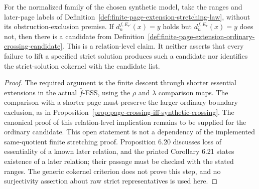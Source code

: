 \begin{lemma}
  \label{lem:page-extension-first-obstruction}
  \notready
  For the normalized family of the chosen synthetic model, take the ranges
  and later-page labels of
  Definition~\ref{def:finite-page-extension-stretching-law}, without its
  obstruction-exclusion premise. If
  $d_n^{f,E_{r'}}(x)=y$ holds but $d_n^{f,E_r}(x)=y$ does not, then there
  is a candidate from
  Definition~\ref{def:finite-page-extension-ordinary-crossing-candidate}.
  This is a relation-level claim.  It neither asserts that every failure
  to lift a specified strict solution produces such a candidate nor
  identifies the strict-solution cokernel with the candidate list.
\end{lemma}

\begin{proof}
  The required argument is the finite descent through shorter essential
  extensions in the actual $\widehat f$-ESS, using the $\rho$ and
  $\lambda$ comparison maps.  The comparison with a shorter page must
  preserve the larger ordinary boundary exclusion, as in
  Proposition~\ref{prop:page-crossing-iff-synthetic-crossing}.
  The canonical proof of this relation-level implication remains to be
  supplied for the ordinary candidate. This open statement is not a
  dependency of the implemented same-quotient finite stretching proof.
  Proposition 6.20 discusses loss of essentiality of a known
  later relation, and the printed Corollary 6.21 states existence of a
  later relation; their passage must be checked with the stated ranges.
  The generic cokernel criterion does not prove this step, and no
  surjectivity assertion about raw strict representatives is used here.
\end{proof}

